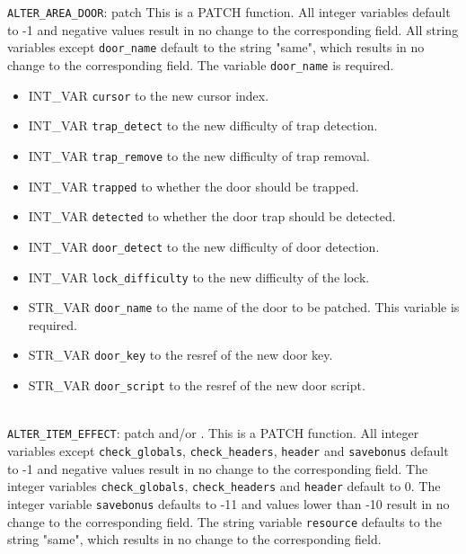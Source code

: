 \documentclass{article}
\begin{document}
\verb+ALTER_AREA_DOOR+: patch  This is a PATCH function. All integer variables default to -1 and negative values result in no change to the corresponding field. All string variables except \verb+door_name+ default to the string "same", which results in no change to the corresponding field. The variable \verb+door_name+ is required.
\begin{itemize}
\item INT_VAR \verb+cursor+ to the new cursor index.
\item INT_VAR \verb+trap_detect+ to the new difficulty of trap detection.
\item INT_VAR \verb+trap_remove+ to the new difficulty of trap removal.
\item INT_VAR \verb+trapped+ to whether the door should be trapped.
\item INT_VAR \verb+detected+ to whether the door trap should be detected.
\item INT_VAR \verb+door_detect+ to the new difficulty of door detection.
\item INT_VAR \verb+lock_difficulty+ to the new difficulty of the lock.
\item STR_VAR \verb+door_name+ to the name of the door to be patched. This variable is required.
\item STR_VAR \verb+door_key+ to the resref of the new door key.
\item STR_VAR \verb+door_script+ to the resref of the new door script.
\end{itemize}
\\

\verb+ALTER_ITEM_EFFECT+: patch  and/or . This is a PATCH function. All integer variables except \verb+check_globals+, \verb+check_headers+, \verb+header+ and \verb+savebonus+ default to -1 and negative values result in no change to the corresponding field. The integer variables \verb+check_globals+, \verb+check_headers+ and \verb+header+ default to 0. The integer variable \verb+savebonus+ defaults to -11 and values lower than -10 result in no change to the corresponding field. The string variable \verb+resource+ defaults to the string "same", which results in no change to the corresponding field.
\end{document}

